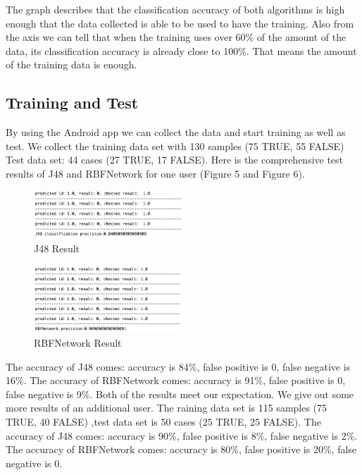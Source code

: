 \documentclass[12pt,twocolumn]{article}
\begin{document}
The graph describes that the classification accuracy of both algorithms is high enough that the data collected is able to be used to have the training. Also from the axis we can tell that when the training uses over 60\% of the amount of the data, its classification accuracy is already close to 100\%. That means the amount of the training data is enough. 

\subsection{Training and Test}
By using the Android app we can collect the data and start training as well as test. We collect the training data set with 130 samples (75 TRUE, 55 FALSE) Test data set: 44 cases (27 TRUE, 17 FALSE). Here is the comprehensive test results of J48 and RBFNetwork for one user (Figure 5 and Figure 6).

\begin{figure}[htbp]
\centering
\includegraphics[width=0.5\textwidth]{result_j48}
\caption{J48 Result}
\label{fig:result_j48}
\end{figure}

\begin{figure}[htbp]
\centering
\includegraphics[width=0.5\textwidth]{result_rbfnetwork}
\caption{RBFNetwork Result}
\label{fig:result_rbfnetwork}
\end{figure}

The accuracy of J48 comes: accuracy is 84\%, false positive is 0, false negative is 16\%. The accuracy of RBFNetwork comes: accuracy is 91\%,  false positive is 0, false negative is 9\%. Both of the results meet our expectation. We give out some more results of an additional user. The raining data set is 115 samples (75 TRUE, 40 FALSE) ,test data set is 50 cases (25 TRUE, 25 FALSE). The accuracy of J48 comes: accuracy is 90\%, false positive is 8\%, false negative is 2\%. The accuracy of RBFNetwork comes: accuracy is 80\%,  false positive is 20\%, false negative is 0.
\end{document}

